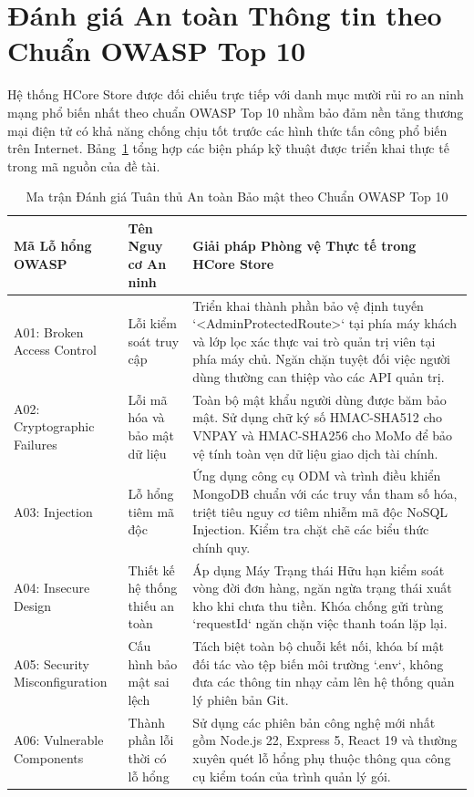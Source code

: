 \section{Đánh giá An toàn Thông tin theo Chuẩn OWASP Top 10}
Hệ thống HCore Store được đối chiếu trực tiếp với danh mục mười rủi ro an ninh mạng phổ biến nhất theo chuẩn OWASP Top 10 nhằm bảo đảm nền tảng thương mại điện tử có khả năng chống chịu tốt trước các hình thức tấn công phổ biến trên Internet. Bảng~\ref{tab:owasp_eval} tổng hợp các biện pháp kỹ thuật được triển khai thực tế trong mã nguồn của đề tài.

\begin{table}[H]
\centering
\caption{Ma trận Đánh giá Tuân thủ An toàn Bảo mật theo Chuẩn OWASP Top 10}
\label{tab:owasp_eval}
\begin{tabularx}{\textwidth}{p{3.5cm}p{4cm}X}
\toprule
\textbf{Mã Lỗ hổng OWASP} & \textbf{Tên Nguy cơ An ninh} & \textbf{Giải pháp Phòng vệ Thực tế trong HCore Store} \\
\midrule
A01: Broken Access Control & Lỗi kiểm soát truy cập & Triển khai thành phần bảo vệ định tuyến `<AdminProtectedRoute>` tại phía máy khách và lớp lọc xác thực vai trò quản trị viên tại phía máy chủ. Ngăn chặn tuyệt đối việc người dùng thường can thiệp vào các API quản trị. \\
\addlinespace
A02: Cryptographic Failures & Lỗi mã hóa và bảo mật dữ liệu & Toàn bộ mật khẩu người dùng được băm bảo mật. Sử dụng chữ ký số HMAC-SHA512 cho VNPAY và HMAC-SHA256 cho MoMo để bảo vệ tính toàn vẹn dữ liệu giao dịch tài chính. \\
\addlinespace
A03: Injection & Lỗ hổng tiêm mã độc & Ứng dụng công cụ ODM và trình điều khiển MongoDB chuẩn với các truy vấn tham số hóa, triệt tiêu nguy cơ tiêm nhiễm mã độc NoSQL Injection. Kiểm tra chặt chẽ các biểu thức chính quy. \\
\addlinespace
A04: Insecure Design & Thiết kế hệ thống thiếu an toàn & Áp dụng Máy Trạng thái Hữu hạn kiểm soát vòng đời đơn hàng, ngăn ngừa trạng thái xuất kho khi chưa thu tiền. Khóa chống gửi trùng `requestId` ngăn chặn việc thanh toán lặp lại. \\
\addlinespace
A05: Security Misconfiguration & Cấu hình bảo mật sai lệch & Tách biệt toàn bộ chuỗi kết nối, khóa bí mật đối tác vào tệp biến môi trường `.env`, không đưa các thông tin nhạy cảm lên hệ thống quản lý phiên bản Git. \\
\addlinespace
A06: Vulnerable Components & Thành phần lỗi thời có lỗ hổng & Sử dụng các phiên bản công nghệ mới nhất gồm Node.js 22, Express 5, React 19 và thường xuyên quét lỗ hổng phụ thuộc thông qua công cụ kiểm toán của trình quản lý gói. \\

\end{tabularx}
\end{table}
